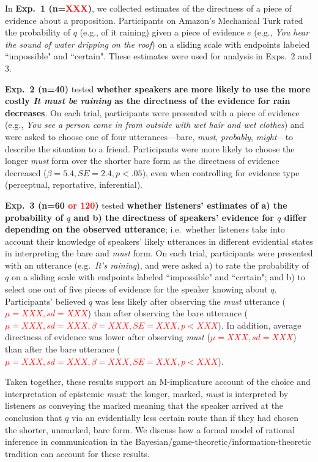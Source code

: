 \documentclass[11pt]{article}
\newcommand{\red}[1]{\textcolor{Red}{#1}}
\begin{document}
In \textbf{Exp.~1 (n=\red{XXX})}, we collected estimates of the directness of a piece of evidence about a proposition. Participants on Amazon's Mechanical Turk rated the probability of $q$ (e.g., of it raining) given a piece of evidence $e$ (e.g., \textit{You hear the sound of water dripping on the roof}) on a sliding scale with endpoints labeled ``impossible" and ``certain". These estimates were used for analysis in Exps.~2 and 3.

\textbf{Exp.~2 (n=40)} tested \textbf{whether speakers are more likely to use the more costly \textit{It must be raining} as the directness of the evidence for rain decreases}. On each trial, participants were presented with a piece of evidence (e.g., \textit{You see a person come in from outside with wet hair and wet clothes}) and were asked to choose one of four utterances---bare, \textit{must}, \textit{probably}, \textit{might}---to describe the situation to a friend. Participants were more likely to choose the longer \textit{must} form over the shorter bare form as the directness of evidence decreased ($\beta=5.4, SE=2.4, p<.05$), even when controlling for evidence type (perceptual, reportative, inferential).

\textbf{Exp.~3 (n=60 \red{or 120})} tested \textbf{whether listeners' estimates of a) the probability of $q$ and b) the directness of speakers' evidence for $q$ differ depending on the observed utterance}; i.e.~whether listeners take into account their knowledge of speakers' likely utterances in different evidential states in interpreting the bare and \textit{must} form. On each trial, participants were presented with an utterance (e.g.~\textit{It's raining}), and were asked a) to rate the probability of $q$ on a sliding scale with endpoints labeled ``impossible" and ``certain"; and b) to select one out of five  pieces of evidence for the speaker knowing about $q$. Participants' believed $q$ was less likely after observing the \textit{must} utterance (\red{$\mu=XXX,sd=XXX$}) than after observing the bare utterance (\red{$\mu=XXX,sd=XXX, \beta=XXX, SE=XXX, p<XXX$}). In addition, average directness of evidence was lower after observing \textit{must} (\red{$\mu=XXX,sd=XXX$}) than after the bare utterance (\red{$\mu=XXX,sd=XXX, \beta=XXX, SE=XXX, p<XXX$}).

Taken together, these results support an M-implicature account of the choice and interpretation of epistemic \textit{must}: the longer, marked, \textit{must} is interpreted by listeners as conveying the marked meaning that the speaker arrived at the conclusion that $q$ via an evidentially less certain route than if they had chosen the shorter, unmarked, bare form. We discuss how a formal model of rational inference in communication in the Bayesian/game-theoretic/information-theoretic tradition \cite{franke, goodman, levy, jaeger} can account for these results.
\end{document}
